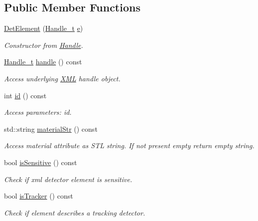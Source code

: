 \subsection*{Public Member Functions}
\begin{DoxyCompactItemize}
\item 
\hyperlink{struct_d_d4hep_1_1_x_m_l_1_1_det_element_af9a3855887f30e3cb111f8c19956c7c6}{Det\+Element} (\hyperlink{class_d_d4hep_1_1_x_m_l_1_1_handle__t}{Handle\+\_\+t} \hyperlink{_volumes_8cpp_a8a9a1f93e9b09afccaec215310e64142}{e})
\begin{DoxyCompactList}\small\item\em Constructor from \hyperlink{class_d_d4hep_1_1_handle}{Handle}. \end{DoxyCompactList}\item 
\hyperlink{class_d_d4hep_1_1_x_m_l_1_1_handle__t}{Handle\+\_\+t} \hyperlink{struct_d_d4hep_1_1_x_m_l_1_1_det_element_a2014a14200d95427d7e42ce436f8ed29}{handle} () const
\begin{DoxyCompactList}\small\item\em Access underlying \hyperlink{namespace_d_d4hep_1_1_x_m_l}{X\+ML} handle object. \end{DoxyCompactList}\item 
int \hyperlink{struct_d_d4hep_1_1_x_m_l_1_1_det_element_a7996df1e7f9605cb7e4ee8eae80adca3}{id} () const
\begin{DoxyCompactList}\small\item\em Access parameters\+: id. \end{DoxyCompactList}\item 
std\+::string \hyperlink{struct_d_d4hep_1_1_x_m_l_1_1_det_element_a87ab96f2e6f27d7c8242fb3b8c0b2dac}{material\+Str} () const
\begin{DoxyCompactList}\small\item\em Access material attribute as S\+TL string. If not present empty return empty string. \end{DoxyCompactList}\item 
bool \hyperlink{struct_d_d4hep_1_1_x_m_l_1_1_det_element_a5795a49f1baaa7afaf7b98eea4e069d2}{is\+Sensitive} () const
\begin{DoxyCompactList}\small\item\em Check if xml detector element is sensitive. \end{DoxyCompactList}\item 
bool \hyperlink{struct_d_d4hep_1_1_x_m_l_1_1_det_element_a92fb0357e40a95fdaef1e406d7dc0fba}{is\+Tracker} () const
\begin{DoxyCompactList}\small\item\em Check if element describes a tracking detector. \end{DoxyCompactList}\item 

\end{DoxyCompactItemize}

